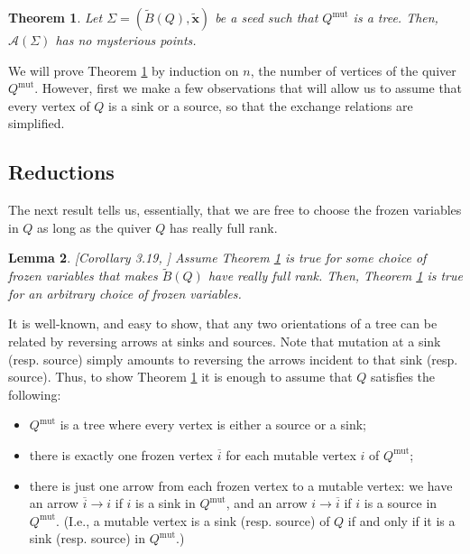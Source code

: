 \documentclass{amsart}
\newcommand{\seed}{\Sigma}
\newcommand{\excluster}[1]{\widetilde{\mathbf{#1}}}
\newcommand{\mut}{\mathrm{mut}}
\newcommand{\exmatrix}[1]{\widetilde{#1}}
\newcommand{\var}{\mathcal{A}}
\numberwithin{equation}{section}
\newtheorem{theorem}{Theorem}[section]
\newtheorem{lemma}[theorem]{Lemma}
\theoremstyle{definition}
\begin{document}
\begin{theorem}\label{thm:main-notintro}
Let $\seed = (\exmatrix{B}(Q), \excluster{x})$ be a seed such that $Q^{\mut}$ is a tree. Then, $\var(\seed)$ has no mysterious points. 
\end{theorem}

We will prove Theorem \ref{thm:main-notintro} by induction on $n$, the number of vertices of the quiver $Q^{\mut}$. However, first we make a few observations that will allow us to assume that every vertex of $Q$ is a sink or a source, so that the exchange relations are simplified.

\subsection{Reductions}\label{sec:reductions} The next result tells us, essentially, that we are free to choose the frozen variables in $Q$ as long as the quiver $Q$ has really full rank. 

\begin{lemma}\label{lem:can-choose-frozens}[Corollary 3.19, \cite{deep}]
Assume Theorem \ref{thm:main-notintro} is true for some choice of frozen variables that makes $\exmatrix{B}(Q)$ have really full rank. Then, Theorem \ref{thm:main-notintro} is true for an arbitrary choice of frozen variables.
\end{lemma}


It is well-known, and easy to show, that any two orientations of a tree can be related by reversing arrows at sinks and sources. Note that mutation at a sink (resp. source) simply amounts to reversing the arrows incident to that sink (resp. source). Thus, to show Theorem \ref{thm:main-notintro} it is enough to assume that $Q$ satisfies the following:
\begin{itemize}
    \item $Q^{\mut}$ is a tree where every vertex is either a source or a sink; 
    \item there is exactly one frozen vertex $\overline{i}$ for each mutable vertex $i$ of $Q^{\mut}$; 
    \item there is just one arrow from each frozen vertex to a mutable vertex: we have an arrow $\boxed{\overline{i}} \to i$ if $i$ is a sink in $Q^{\mut}$, and an arrow $i \to \boxed{\overline{i}}$ if $i$ is a source in $Q^{\mut}$. (I.e., a mutable vertex is a sink (resp. source) of $Q$ if and only if it is a sink (resp. source) in $Q^{\mut}$.)
\end{itemize}
\end{document}
